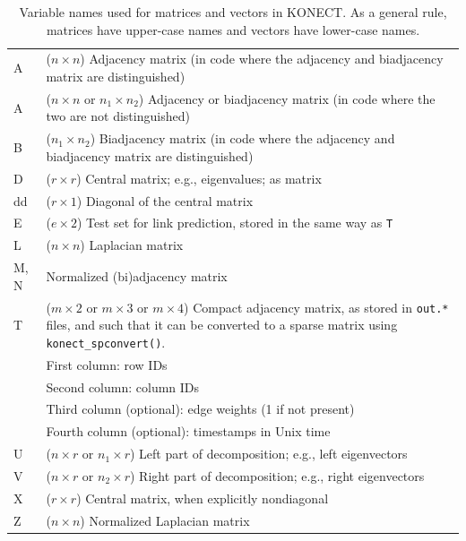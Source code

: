 \documentclass{article}
\begin{document}
\begin{table}[h]
  \caption{ 
    Variable names used for matrices and vectors in KONECT.
    As a general rule, matrices have upper-case names and vectors have
    lower-case names. 
    \label{tab:matrix-variables}
  } 
  \centering
  \begin{tabular}{>{\ttfamily}lp{}}
    \toprule 
    A & ($n \times n$) Adjacency matrix (in code where the
    adjacency and biadjacency matrix are distinguished) \\ 
    A & ($n \times n$ or $n_1 \times n_2$) Adjacency or biadjacency matrix (in
    code where the two are not distinguished) \\ 
    B & ($n_1 \times n_2$) Biadjacency matrix
    (in code where the adjacency and biadjacency matrix are
    distinguished) \\ 
    D & ($r \times r$) Central matrix; e.g.,
    eigenvalues; as matrix \\ 
    dd & ($r \times 1$) Diagonal of the
    central matrix \\ 
    E & ($e \times 2$) Test set for link prediction, stored in the same
    way as \texttt{T} \\
    L & ($n \times n$) Laplacian matrix \\ 
    M, N &
    Normalized (bi)adjacency matrix \\ 
    T & ($m \times 2$ or
    $m \times 3$ or $m \times 4$) Compact adjacency matrix, as stored in
    \texttt{out.*} files, and such that it can be converted to a sparse
    matrix using \texttt{konect\_spconvert()}. \\ 
    & First column: row
    IDs \\ 
    & Second column: column IDs \\ 
    & Third column (optional):
    edge weights (1 if not present) \\ 
    & Fourth column (optional):
    timestamps in Unix time \\ 
    U & ($n \times r$ or $n_1 \times
    r$) Left part of decomposition; e.g., left eigenvectors \\ 
    V & ($n
    \times r$ or $n_2 \times r$) Right part of decomposition; e.g.,
    right eigenvectors \\ 
    X & ($r \times r$) Central matrix, when
    explicitly nondiagonal \\ 
    Z & ($n \times n$) Normalized Laplacian
    matrix \\ 
    \bottomrule
\end{tabular}
\end{table}
\end{document}
